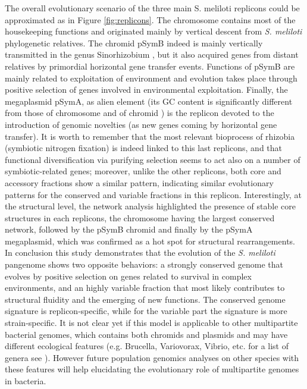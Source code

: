 The overall evolutionary scenario of the three main S. meliloti replicons could be approximated as in Figure \ref{fig:replicons}. The chromosome contains most of the housekeeping functions and originated mainly by vertical descent from \textit{S. meliloti} phylogenetic relatives. The chromid pSymB indeed is mainly vertically transmitted in the genus Sinorhizobium \cite{harrison2010introducing} \cite{bailly2011population}, but it also acquired genes from distant relatives by primordial horizontal gene transfer events. Functions of pSymB are mainly related to exploitation of environment and evolution takes place through positive selection of genes involved in environmental exploitation. Finally, the megaplasmid pSymA, as alien element (its GC content is significantly different from those of chromosome and of chromid \cite{galibert2001composite}) is the replicon devoted to the introduction of genomic novelties (as new genes coming by horizontal gene transfer). It is worth to remember that the most relevant bioprocess of rhizobia (symbiotic nitrogen fixation) is indeed linked to this last replicons, and that functional diversification via purifying selection seems to act also on a number of symbiotic-related genes; moreover, unlike the other replicons, both core and accessory fractions show a similar pattern, indicating similar evolutionary patterns for the conserved and variable fractions in this replicon. Interestingly, at the structural level, the network analysis highlighted the presence of stable core structures in each replicons, the chromosome having the largest conserved network, followed by the pSymB chromid and finally by the pSymA megaplasmid, which was confirmed as a hot spot for structural rearrangements.
In conclusion this study demonstrates that the evolution of the \textit{S. meliloti} pangenome shows two opposite behaviors: a strongly conserved genome that evolves by positive selection on genes related to survival in complex environments, and an highly variable fraction that most likely contributes to structural fluidity and the emerging of new functions. The conserved genome signature is replicon-specific, while for the variable part the signature is more strain-specific. It is not clear yet if this model is applicable to other multipartite bacterial genomes, which contains both chromids and plasmids and may have different ecological features (e.g. Brucella, Variovorax, Vibrio, etc. for a list of genera see \cite{harrison2010introducing}). However future population genomics analyses on other species with these features will help elucidating the evolutionary role of multipartite genomes in bacteria.


\backmatter
{}
\renewcommand{\sectionmark}[1]{\markright{#1}}
\sectionmark{Bibliography}
